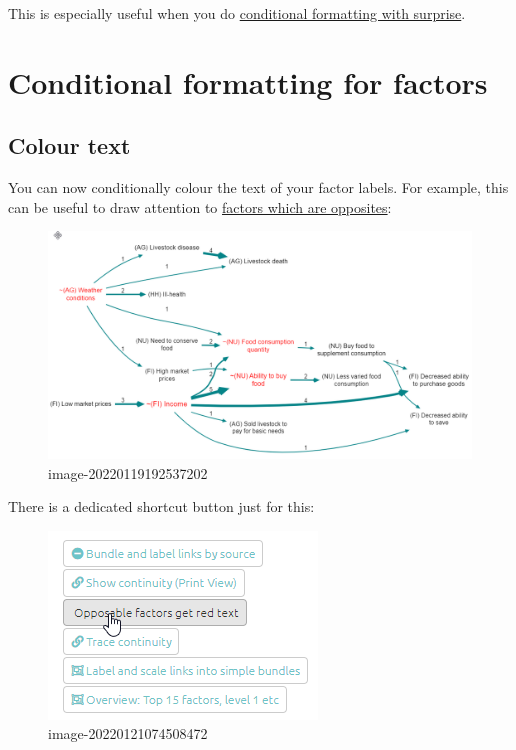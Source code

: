 \documentclass[
]{book}
\begin{document}
This is especially useful when you do \protect\hyperlink{xsurprise}{conditional formatting with surprise}.

\hypertarget{conditional-formatting-for-factors}{%
\section{Conditional formatting for factors}\label{conditional-formatting-for-factors}}

\hypertarget{xcolour-text}{%
\subsection{Colour text}\label{xcolour-text}}

You can now conditionally colour the text of your factor labels. For example, this can be useful to draw attention to \href{https://causalmap.shinyapps.io/CM2test/?s=651}{factors which are opposites}:

\begin{figure}
\centering
\includegraphics{_assets/image-20220119192537202.png}
\caption{image-20220119192537202}
\end{figure}

There is a dedicated shortcut button just for this:

\begin{figure}
\centering
\includegraphics{_assets/image-20220121074508472.png}
\caption{image-20220121074508472}
\end{figure}
\end{document}
